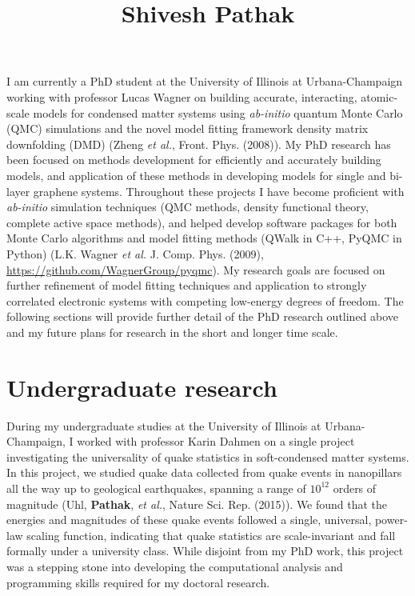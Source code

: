 \documentclass{article}
\title{Shivesh Pathak}
\date{\vspace{-10ex}}
\begin{document}
\maketitle

I am currently a PhD student at the University of Illinois at Urbana-Champaign working with professor Lucas Wagner on building accurate, interacting, atomic-scale models for condensed matter systems using \textit{ab-initio} quantum Monte Carlo (QMC) simulations and the novel model fitting framework density matrix downfolding (DMD) (Zheng \textit{et al.}, Front. Phys.  (2008)).
My PhD research has been focused on methods development for efficiently and accurately building models, and application of these methods in developing models for single and bi-layer graphene systems.
Throughout these projects I have become proficient with \textit{ab-initio} simulation techniques (QMC methods, density functional theory, complete active space methods), and helped develop software packages for both Monte Carlo algorithms and model fitting methods (QWalk in C++, PyQMC in Python) (L.K. Wagner \textit{et al.} J.  Comp.  Phys. (2009), \url{https://github.com/WagnerGroup/pyqmc}).
My research goals are focused on further refinement  of model fitting techniques and application to strongly correlated electronic systems with competing low-energy degrees of freedom.
The following sections will provide further detail of the PhD research outlined above and my future plans for research in the short and longer time scale.

\section{Undergraduate research}
During my undergraduate studies at the University of Illinois at Urbana-Champaign, I worked with professor Karin Dahmen on a single project investigating the universality of quake statistics in soft-condensed matter systems.
In this project,  we studied quake data collected from quake events in nanopillars all the way up to geological earthquakes, spanning a range of $10^{12}$ orders of magnitude (Uhl, \textbf{Pathak}, \textit{et al.}, Nature Sci. Rep. (2015)).
We found that the energies and magnitudes of these quake events followed a single, universal, power-law scaling function, indicating that quake statistics are scale-invariant and fall formally under a university class.
While disjoint from my PhD work, this project was a stepping stone into developing the computational analysis and programming skills required for my doctoral research.
\end{document}
